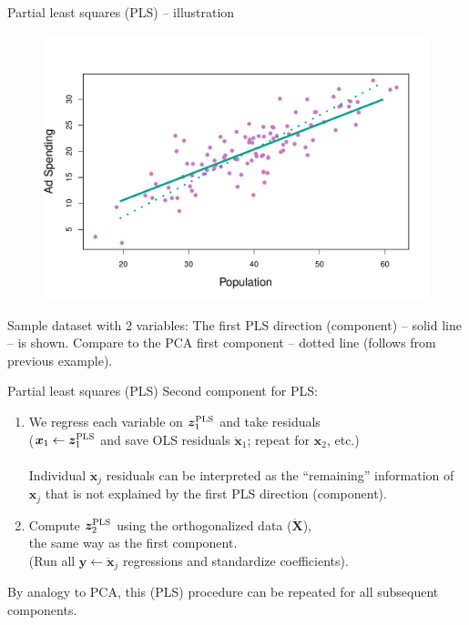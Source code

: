\documentclass{beamer}
\begin{document}
\begin{frame}{Partial least squares (PLS) -- illustration}
\vspace{-1.2cm}
\begin{figure}
\includegraphics[scale=0.50]{IMG/PCAExample5.pdf}
\end{figure}
\vspace{-0.6cm}
\centering Sample dataset with 2 variables: The first PLS direction (component) -- solid line -- is shown. Compare to the PCA first component -- dotted line (follows from previous example).
\end{frame}
\begin{frame}{Partial least squares (PLS)}
Second component for PLS:\\
\medskip
\begin{enumerate}
    \item We regress each variable on $\bm{z}_1^{\textnormal{PLS}}$ and take residuals \\($\bm{x}_1 \leftarrow \bm{z}_1^{\textnormal{PLS}}$ and save OLS residuals $\ddot{\bm{x}}_1$; repeat for $\bm{x}_2$, etc.)\\~\\
    Individual $\ddot{\bm{x}}_j$ residuals can be interpreted as the ``remaining'' information of $\bm{x}_j$ that is not explained by the first PLS direction (component).\\
    \medskip
    \item Compute $\bm{z}_2^{\textnormal{PLS}}$ using the orthogonalized data ($\ddot{\bm{X}}$), \\the same way as the first component.\\
    (Run all $\bm{y} \leftarrow \ddot{\bm{x}}_j$ regressions and standardize coefficients).
\end{enumerate}
\bigskip
By analogy to PCA, this (PLS) procedure can be repeated for all subsequent components.
\end{frame}
\end{document}
